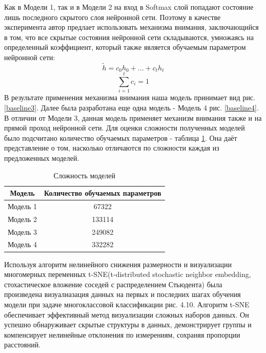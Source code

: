    Как в Модели 1, так и в Модели 2 на вход в Softmax слой попадают состояние лишь последного скрытого слоя нейронной сети. Поэтому в качестве эксперимента автор предлает использовать механизма внимания, заключающийся в том, что все скрытые состояния нейронной сети складываются, умножаясь на определенный коэффициент, который также является обучаемым параметром нейронной сети:
    \begin{equation}\label{attention}
    \tilde{h} = c_{0}h_{0}+...+c_{t}h_{t}
    \end{equation}
    \begin{equation}\label{coeff}
    \sum_{i=1}^{t} c_{i}=1
    \end{equation}
    В результате применения механизма внимания наша модель принимает вид рис. \ref{baseline3}.
    Далее была разработана еще одна модель - Модель 4 рис. \ref{baseline4}. В отличии от Модели 3, данная модель применяет механизм внимания также и на прямой проход нейронной сети.
    Для оценки сложности полученных моделей было подсчитано количество обучаемых параметров - таблица \ref{hard}. Она даёт представление о том, насколько отличаются по сложности каждая из предложенных моделей.
    \begin{table}[H]
    \centering
    \caption{Сложность моделей}\label{hard}
    \begin{tabular}{@{}cc@{}}
    \toprule
    Модель         & Количество обучаемых параметров \\ \midrule
    Модель 1 & 67322     \\
    Модель 2 & 133114      \\
    Модель 3 & 249082    \\
    Модель 4 & 332282   \\ \bottomrule
    \end{tabular}
    \end{table}

    Используя алгоритм нелинейного снижения размерности и визуализации многомерных переменных t-SNE(t-distributed stochastic neighbor embedding, стохастическое вложение соседей с распределением Стьюдента) была произведена визуалиазация данных на первых и последних шагах обучения модели при задаче многоклассовой классификации рис. 4.10. Алгоритм t-SNE обеспечивает эффективный метод визуализации сложных наборов данных. Он успешно обнаруживает скрытые структуры в данных, демонстрирует группы и компенсирует нелинейные отклонения по измерениям, сохраняя пропорции расстояний.
    

